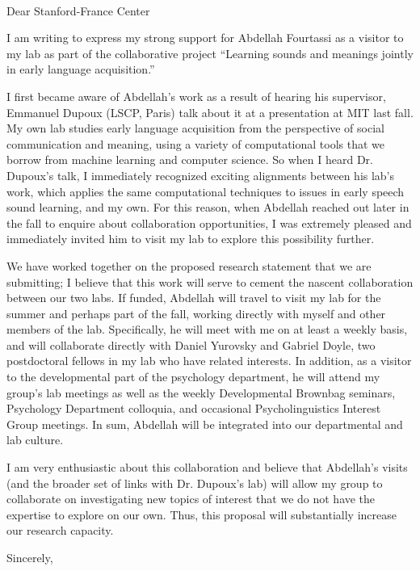 \documentclass[12pt]{letter}
\begin{document}
\begin{letter}{~~}


\opening{Dear Stanford-France Center}

I am writing to express my strong support for Abdellah Fourtassi as a visitor to my lab as part of the collaborative project ``Learning sounds and meanings jointly in early language acquisition.''

I first became aware of Abdellah's work as a result of hearing his supervisor, Emmanuel Dupoux (LSCP, Paris) talk about it at a presentation at MIT last fall. My own lab studies early language acquisition from the perspective of social communication and meaning, using a variety of computational tools that we borrow from machine learning and computer science. So when I heard Dr. Dupoux's talk, I immediately recognized exciting alignments between his lab's work, which applies the same computational techniques to issues in early speech sound learning, and my own. For this reason, when Abdellah reached out later in the fall to enquire about collaboration opportunities, I was extremely pleased and immediately invited him to visit my lab to explore this possibility further. 

We have worked together on the proposed research statement that we are submitting; I believe that this work will serve to cement the nascent collaboration between our two labs. If funded, Abdellah will travel to visit my lab for the summer and perhaps part of the fall, working directly with myself and other members of the lab. Specifically, he will meet with me on at least a weekly basis, and will collaborate directly with Daniel Yurovsky and Gabriel Doyle, two postdoctoral fellows in my lab who have related interests. In addition, as a visitor to the developmental part of the psychology department, he will attend my group's lab meetings as well as the weekly Developmental Brownbag seminars, Psychology Department colloquia, and occasional Psycholinguistics Interest Group meetings. In sum, Abdellah will be integrated into our departmental and lab culture. 

I am very enthusiastic about this collaboration and believe that Abdellah's visits (and the broader set of links with Dr. Dupoux's lab) will allow my group to collaborate on investigating new topics of interest that we do not have the expertise to explore on our own. Thus, this proposal will substantially increase our research capacity. 

\closing{Sincerely,}

\end{letter}
\end{document}
